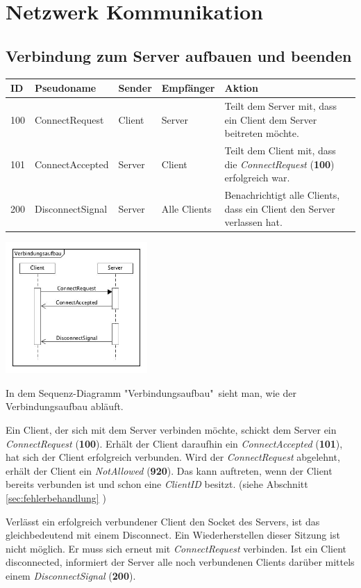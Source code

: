 \documentclass[a4paper, 10pt]{article}
\begin{document}
\section{Netzwerk Kommunikation}
\subsection{Verbindung zum Server aufbauen und beenden}

\begin{center}
	\begin{tabular}{| l | l | p{2.5cm} | p{2.5cm} | p{6cm} |}
		\hline
			ID & Pseudoname & Sender & Empfänger & Aktion \\
		\hline \hline
			100 & ConnectRequest & Client & Server &
			Teilt dem Server mit, dass ein Client dem Server beitreten möchte. \\
		\hline
			101 & ConnectAccepted & Server & Client &
			Teilt dem Client mit, dass die \textit{ConnectRequest} (\textbf{100}) erfolgreich war. \\
		\hline
			200 & DisconnectSignal & Server & Alle Clients &
			Benachrichtigt alle Clients, dass ein Client den Server verlassen hat. \\
		\hline
	\end{tabular}

	\includegraphics[height=5cm]{media/SequenceBuildConnection}
\end{center}
In dem Sequenz-Diagramm "Verbindungsaufbau"\ sieht man, wie der Verbindungsaufbau abläuft.\par
Ein Client, der sich mit dem Server verbinden möchte, schickt dem Server ein \textit{ConnectRequest} (\textbf{100}). Erhält der Client daraufhin ein \textit{ConnectAccepted} (\textbf{101}), hat sich der Client erfolgreich verbunden. Wird der \textit{ConnectRequest} abgelehnt, erhält der Client ein \textit{NotAllowed} (\textbf{920}). Das kann auftreten, wenn der Client bereits verbunden ist und schon eine \textit{ClientID} besitzt. (siehe Abschnitt \ref{sec:fehlerbehandlung} )\par
Verlässt ein erfolgreich verbundener Client den Socket des Servers, ist das gleichbedeutend mit einem Disconnect. Ein Wiederherstellen dieser Sitzung ist nicht möglich. Er muss sich erneut mit \textit{ConnectRequest} verbinden. Ist ein Client disconnected, informiert der Server alle noch verbundenen Clients darüber mittels einem \textit{DisconnectSignal} (\textbf{200}).
\end{document}
